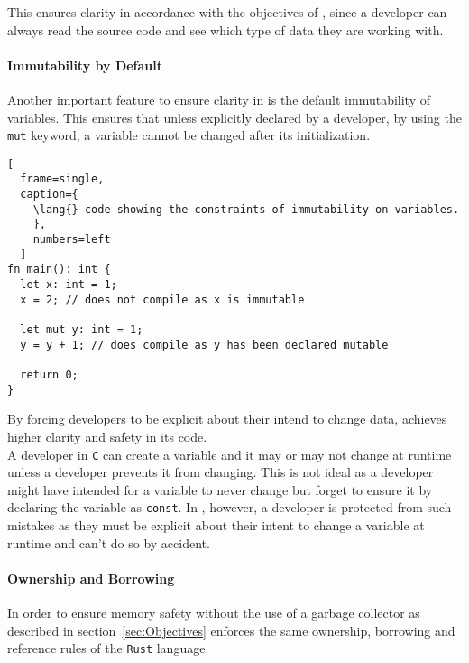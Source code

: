This ensures clarity in accordance with the objectives of \lang{}, since a
developer can always read the source code and see which type of data they are working
with.

\paragraph{Immutability by Default} \hfill 
\vspace{0.1em}

Another important feature to ensure clarity in \lang{} is the default immutability of
variables. This ensures that unless explicitly declared by a developer, by using the
\texttt{mut} keyword, a variable
cannot be changed after its initialization.

\begin{lstlisting}[
  frame=single,
  caption={
    \lang{} code showing the constraints of immutability on variables.
    }, 
    numbers=left
  ]
fn main(): int {
  let x: int = 1; 
  x = 2; // does not compile as x is immutable

  let mut y: int = 1; 
  y = y + 1; // does compile as y has been declared mutable

  return 0;
}
\end{lstlisting}

By forcing developers to be explicit about their intend to change data, \lang{}
achieves higher clarity and safety in its code. \\ 

A developer in \texttt{C} can create a variable and it may or may not change at
runtime unless a developer prevents it from changing. This is not ideal as a
developer might have intended for a variable to never change but forget to ensure it
by declaring the variable as \texttt{const}. In \lang, however, a developer is protected from
such mistakes as they must be explicit about their intent to change a variable at
runtime and can't do so by accident.

\newpage

\paragraph{Ownership and Borrowing} \hfill 
\label{par:Ownership}

In order to ensure memory safety without the use of a garbage collector as described
in section~\ref{sec:Objectives} \lang{} enforces the same ownership, borrowing and
reference rules of the \texttt{Rust} language\cite{RUST}.

